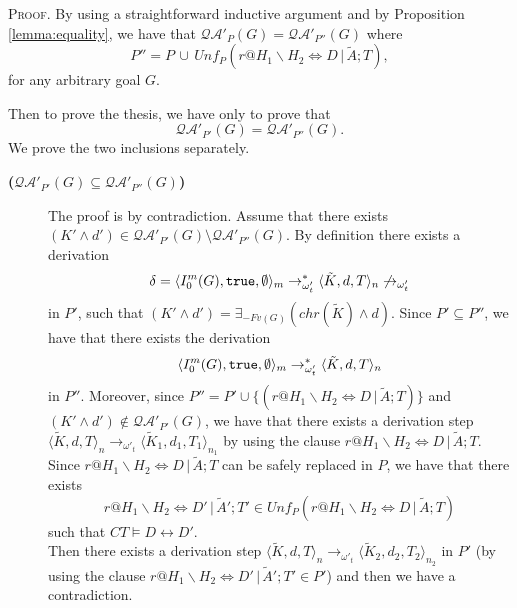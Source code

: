 \documentclass[final]{acmtrans2e}
\begin{document}
\textsc{Proof.} By using a straightforward inductive argument and by
Proposition \ref{lemma:equality}, we have that
$\mathcal{QA'}_{P}(G)=\mathcal{QA'}_{P''}(G)$ where
 \[
  P'' = P \, \cup \, Unf_{P}(r@H_1\backslash H_2 \Leftrightarrow D\,|\,\tilde A; T),
\]
for any arbitrary goal $G$.

Then to prove the thesis, we have only to prove that
\[\mathcal{QA'}_{P'}(G) = \mathcal{QA'}_{P''}(G).\]
We prove the two inclusions separately.
\begin{description}
  \item[{\bf ($\mathcal{QA'}_{P'}(G) \subseteq \mathcal{QA'}_{P''}(G)$) }]
  The proof is by contradiction. Assume that there exists $(K'\wedge d') \in \mathcal{QA'}_{P'}(G) \setminus \mathcal{QA'}_{P''}(G)$. By definition there exists a derivation
  \[\delta=\langle I_0^m (G),
{\tt true}, \emptyset\rangle_m\rightarrow^{*}_{\omega'_t}
\langle \tilde K, d, T\rangle_n\not\rightarrow_{\omega'_t}\]
in $P'$, such that $(K'\wedge d') =
\exists _{-Fv(G)}(chr( \tilde K)\wedge d)$. Since $P' \subseteq P''$, we have that there exists the derivation
\[\langle I_0^m (G),
{\tt true}, \emptyset\rangle_m\rightarrow^{*}_{\omega'_t}
\langle \tilde K, d, T\rangle_n\] in $P''$. Moreover, since $P'' =P '\cup \{(r@H_1\backslash H_2 \Leftrightarrow D\,|\,\tilde A; T)\} $ and $(K'\wedge d')\not  \in \mathcal{QA'}_{P'}(G)$, we have that there exists a derivation step $\langle \tilde K, d, T\rangle_n\rightarrow_{\omega'_t}
\langle \tilde K_1, d_1, T_1\rangle_{n_1}$ by using the clause $r@H_1\backslash H_2 \Leftrightarrow D\,|\,\tilde A; T$. \\
Since $r@H_1\backslash H_2 \Leftrightarrow  D\,|\,\tilde A; T $ can be safely replaced
in $P$, we have that there exists \[r@H_1\backslash H_2 \Leftrightarrow  D'\,|\,\tilde A'; T' \in Unf_{P}(r@H_1\backslash H_2 \Leftrightarrow D\,|\,\tilde A; T)\] such that
$CT \models D \leftrightarrow D'$. \\
Then there exists a derivation step $\langle \tilde K, d, T\rangle_n\rightarrow_{\omega'_t}
\langle \tilde K_2, d_2, T_2\rangle_{n_2}$ in $P'$ (by using the clause $r@H_1\backslash H_2 \Leftrightarrow  D'\,|\,\tilde A'; T' \in P'$) and then we have a contradiction.



\end{description}
\end{document}
